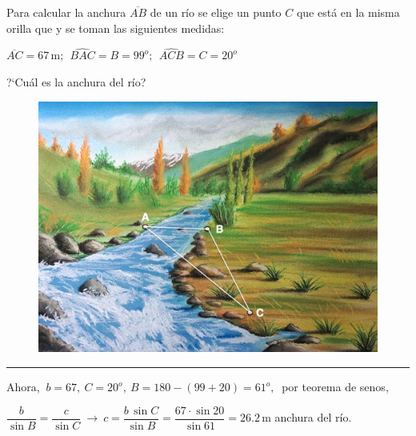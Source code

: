 \begin{miejercicio}

\begin{multicols}{2}

	Para calcular la anchura $\overline{AB}$ de un río se elige un punto $C$ que está en la misma orilla que y se toman las siguientes medidas: 
	
\vspace{2mm}  $\overline{AC}=67\, \mathrm{m};\ \ \widehat{BAC}=B=99^o;\ \ \widehat{ACB}=C=20^o$
 
\vspace{2mm}  ?`Cuál es la anchura del río?
 
	\begin{figure}[H]
	\centering
	\includegraphics[width=.4\textwidth]{img-triang/triang16.png}
\end{figure}
\end{multicols}

\vspace{-6mm}

\rule{250pt}{0.1pt}

\vspace{2mm} Ahora, $\ b=67,\ C=20^o,\ B=180-(99+20)=61^o,\ $ por teorema de senos,

\vspace{2mm} $\dfrac{b}{\sin B}=\dfrac{c}{\sin C} \ \to \ c=\dfrac{b\, \sin C}{\sin B}=\dfrac{67\cdot \sin 20}{\sin 61}=26.2\, \mathrm{m}$ anchura del río.

	
\end{miejercicio}



